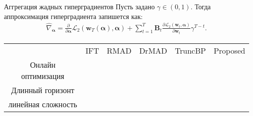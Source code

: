 \documentclass[aspectratio=169]{beamer}
\begin{document}
\begin{frame}{Аггрегация жадных гиперградиентов}
  Пусть задано $\gamma \in (0, 1)$. Тогда аппроксимация гиперградиента запишется как:
  \begin{align*}
    \hat{\nabla}_{\boldsymbol{\alpha}} = \frac{\partial}{\partial \boldsymbol{\alpha}}\mathcal{L}_2(\mathbf{w}_T(\boldsymbol{\alpha}), \boldsymbol{\alpha}) +
    \sum_{t=1}^T \mathbf{B}_t\frac{\partial\mathcal{L}_2(\mathbf{w}_t, \boldsymbol{\alpha})}{\partial \mathbf{w}_t}\gamma^{T-t}.
  \end{align*}
  \begin{table}
    \begin{tabular}{c|c|c|c|c|c}
       & IFT & RMAD & DrMAD & TruncBP & Proposed \\
      Онлайн оптимизация & \color{dark_red}{\texttimes} & \color{dark_green}{\checkmark} & \color{dark_red}{\texttimes} & \color{dark_green}{\checkmark} & \color{dark_green}{\checkmark} \\
      Длинный горизонт & \color{dark_green}{\checkmark} & \color{dark_green}{\checkmark} & \color{dark_green}{\checkmark} & \color{dark_red}{\texttimes} & \color{dark_green}{\checkmark} \\
      линейная сложность & \color{dark_green}{\checkmark} & \color{dark_red}{\texttimes} & \color{dark_green}{\checkmark} & \color{dark_green}{\checkmark} & \color{dark_green}{\checkmark} \\
      
    \end{tabular}
  \end{table}
  
\end{frame}








\end{document}
